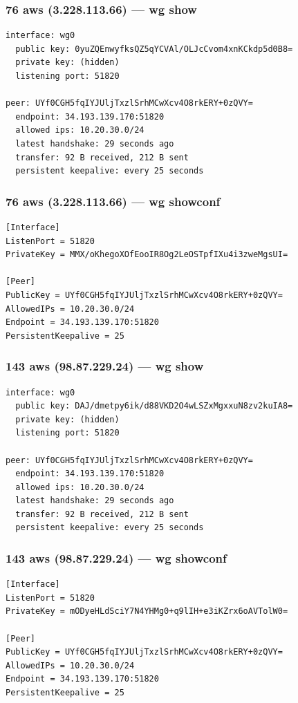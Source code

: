 \documentclass[11pt,a4paper]{article}
\begin{document}
\subsubsection*{76 aws (3.228.113.66) — wg show}
\begin{lstlisting}
interface: wg0
  public key: 0yuZQEnwyfksQZ5qYCVAl/OLJcCvom4xnKCkdp5d0B8=
  private key: (hidden)
  listening port: 51820

peer: UYf0CGH5fqIYJUljTxzlSrhMCwXcv4O8rkERY+0zQVY=
  endpoint: 34.193.139.170:51820
  allowed ips: 10.20.30.0/24
  latest handshake: 29 seconds ago
  transfer: 92 B received, 212 B sent
  persistent keepalive: every 25 seconds

\end{lstlisting}

\subsubsection*{76 aws (3.228.113.66) — wg showconf}
\begin{lstlisting}
[Interface]
ListenPort = 51820
PrivateKey = MMX/oKhegoXOfEooIR8Og2LeOSTpfIXu4i3zweMgsUI=

[Peer]
PublicKey = UYf0CGH5fqIYJUljTxzlSrhMCwXcv4O8rkERY+0zQVY=
AllowedIPs = 10.20.30.0/24
Endpoint = 34.193.139.170:51820
PersistentKeepalive = 25

\end{lstlisting}

\subsubsection*{143 aws (98.87.229.24) — wg show}
\begin{lstlisting}
interface: wg0
  public key: DAJ/dmetpy6ik/d88VKD2O4wLSZxMgxxuN8zv2kuIA8=
  private key: (hidden)
  listening port: 51820

peer: UYf0CGH5fqIYJUljTxzlSrhMCwXcv4O8rkERY+0zQVY=
  endpoint: 34.193.139.170:51820
  allowed ips: 10.20.30.0/24
  latest handshake: 29 seconds ago
  transfer: 92 B received, 212 B sent
  persistent keepalive: every 25 seconds

\end{lstlisting}

\subsubsection*{143 aws (98.87.229.24) — wg showconf}
\begin{lstlisting}
[Interface]
ListenPort = 51820
PrivateKey = mODyeHLdSciY7N4YHMg0+q9lIH+e3iKZrx6oAVTolW0=

[Peer]
PublicKey = UYf0CGH5fqIYJUljTxzlSrhMCwXcv4O8rkERY+0zQVY=
AllowedIPs = 10.20.30.0/24
Endpoint = 34.193.139.170:51820
PersistentKeepalive = 25

\end{lstlisting}
\end{document}
